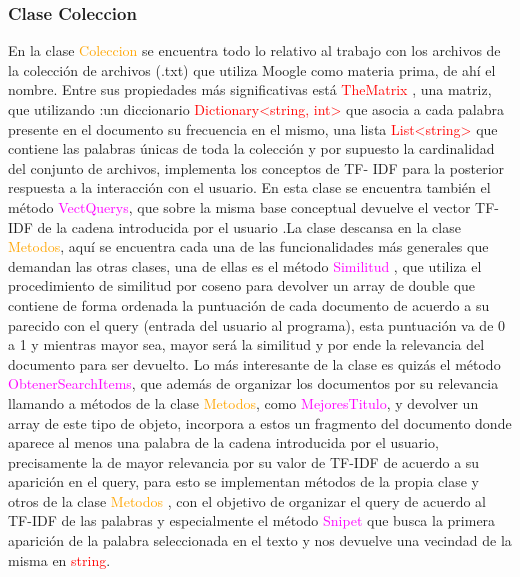 \documentclass[a4paper, 12pt]{article}
\begin{document}
\subsubsection{Clase Coleccion}\label{sub;col}
En la clase \textcolor{orange}{Coleccion} se encuentra todo lo relativo al trabajo con los archivos de la colección de archivos (.txt) que utiliza Moogle como materia prima, de ahí el nombre. Entre sus propiedades más significativas está  \textcolor{red}{TheMatrix} , una matriz, que utilizando :un diccionario \textcolor{red}{Dictionary\textless string, int\textgreater} que asocia a cada palabra presente en el documento su frecuencia en el mismo, una lista \textcolor{red}{List\textless string\textgreater} que contiene las palabras únicas de toda la colección y por supuesto la cardinalidad del conjunto de archivos, implementa los conceptos de TF- IDF para la posterior respuesta a la interacción con el usuario. En esta clase se encuentra también el método  \textcolor{magenta}{VectQuerys}, que sobre la misma base conceptual devuelve el vector TF-IDF de la cadena introducida por el usuario .La clase descansa en la clase  \textcolor{orange}{Metodos}, aquí se encuentra cada una de las funcionalidades más generales que demandan las otras clases, una de ellas es el método  \textcolor{magenta}{Similitud} , que utiliza el procedimiento de similitud por coseno para devolver un array de double que contiene de forma ordenada la puntuación de cada documento de acuerdo a su parecido con el query  (entrada del usuario al programa), esta puntuación va de 0 a 1 y mientras mayor sea, mayor será la similitud y por ende la relevancia del documento para ser devuelto. Lo más interesante de la clase es quizás el método  \textcolor{magenta}{ObtenerSearchItems}, que además de organizar los documentos por su relevancia llamando a métodos de la clase  \textcolor{orange}{Metodos}, como \textcolor{magenta}{MejoresTitulo}, y devolver un array de este tipo de objeto, incorpora a estos un fragmento del documento donde aparece al menos una palabra de la cadena introducida por el usuario, precisamente la de mayor relevancia por su valor de TF-IDF de acuerdo a su aparición en el query, para esto se implementan métodos de la propia clase y otros de la clase  \textcolor{orange}{Metodos} , con el objetivo de organizar el query de acuerdo al TF-IDF de las palabras y especialmente el método  \textcolor{magenta}{Snipet} que busca la primera aparición de la palabra seleccionada en el texto y nos devuelve una vecindad de la misma en  \textcolor{red}{string}.
\end{document}
